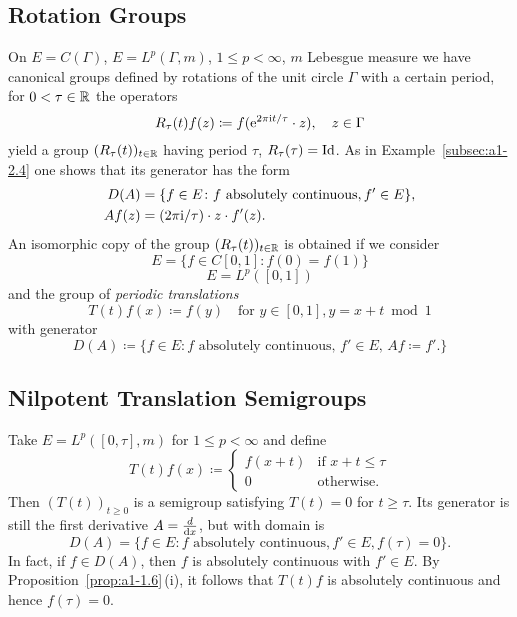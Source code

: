 \subsection{Rotation Groups}\label{subsec:a1-2.5}
On $E = C(\Gamma)$, \resp $E = L^{p}(\Gamma,m)$, $1 \leq p < \infty$, $m$ Lebesgue measure we have canonical groups defined by rotations of the unit circle $\Gamma$ with a certain period, \ie for $0 < \tau \in \mathbb{R}$ the operators
\[
    R_{\tau}(t)f(z) \coloneqq f( \mathrm{e}^{2\pi \mathrm{i} t/\tau}\cdot z), \quad z \in \Gamma
\]
yield a group $(R_{\tau}(t))_{t \in \mathbb{R}}$ having period $\tau$, \ie $R_{\tau}(\tau) = \operatorname{Id}$.
As in Example~\ref{subsec:a1-2.4} one shows that its generator has the form
\begin{align*}
    D(A) &= \{f \in E \colon f \text{ absolutely continuous}, f' \in E\}, \\
    Af(z)&= (2\pi \mathrm{i}/\tau) \cdot z \cdot f'(z).
\end{align*}
An isomorphic copy of the group $(R_{\tau}(t))_{t \in \mathbb{R}}$ is obtained if we consider 
\[
E = \{f \in C\left[ 0,1 \right] \colon f(0) = f(1)\}
\]
\resp 
\[
E = L^{p}(\left[ 0,1 \right])
\]
and the group of \emph{periodic translations}
\[
    T(t)f(x) \coloneqq f(y) \quad \text{for $y \in \left[ 0,1 \right], y = x+t \bmod 1$} 
\]
with generator
\[
    D(A) \coloneqq \{f \in E \colon f \text{ absolutely continuous, $f' \in E$, $Af \coloneqq f'$.}\}
\]
\subsection{Nilpotent Translation Semigroups}\label{subsec:a1-2.6}
Take $E = L^{p}([0,\tau],m)$ for $1 \leq p < \infty$ and define
\[
    T(t)f(x) \coloneqq \begin{cases}
        f(x+t) & \text{if } x+t \leq \tau \\
        0 & \text{otherwise.}
    \end{cases}
\]
Then $(T(t))_{t\geq 0}$ is a semigroup satisfying $T(t) = 0$ for $t \geq \tau$.
Its generator is still the first derivative $A = \frac{d}{\mathop{}\!\mathrm{d}{x}}$, but with domain is 
\[
D(A) = \{f \in E \colon f \text{ absolutely continuous}, f' \in E, f(\tau) = 0\}.
\]
In fact, if $f \in D(A)$, then $f$ is absolutely continuous with $f' \in E$.
By Proposition~\ref{prop:a1-1.6}\,(i), it follows that $T(t)f$ is absolutely continuous and hence $f(\tau) = 0$.
